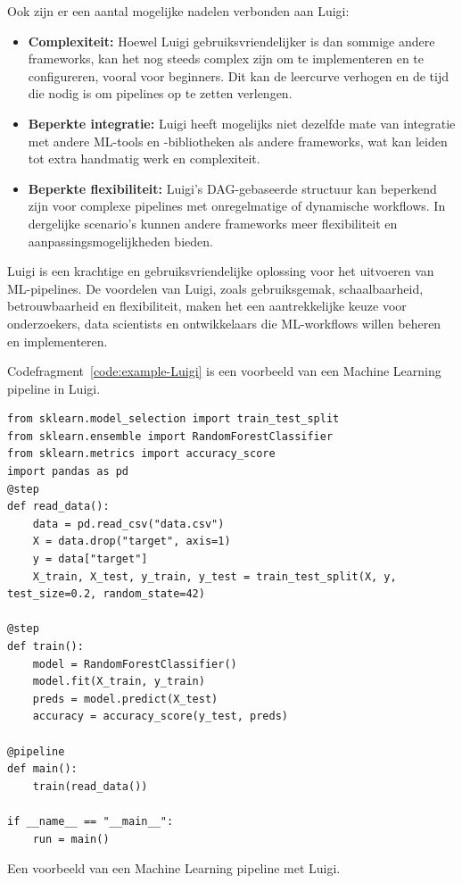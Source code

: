 Ook zijn er een aantal mogelijke nadelen verbonden aan Luigi:
\begin{itemize}
    \item \textbf{Complexiteit:} Hoewel Luigi gebruiksvriendelijker is dan sommige andere frameworks, kan het nog steeds complex zijn om te implementeren en te configureren, vooral voor beginners. Dit kan de leercurve verhogen en de tijd die nodig is om pipelines op te zetten verlengen.
    \item \textbf{Beperkte integratie:} Luigi heeft mogelijks niet dezelfde mate van integratie met andere ML-tools en -bibliotheken als andere frameworks, wat kan leiden tot extra handmatig werk en complexiteit.
    \item \textbf{Beperkte flexibiliteit:} Luigi's DAG-gebaseerde structuur kan beperkend zijn voor complexe pipelines met onregelmatige of dynamische workflows. In dergelijke scenario's kunnen andere frameworks meer flexibiliteit en aanpassingsmogelijkheden bieden.
  \end{itemize}

Luigi is een krachtige en gebruiksvriendelijke oplossing voor het uitvoeren van ML-pipelines. De voordelen van Luigi, zoals gebruiksgemak, schaalbaarheid, betrouwbaarheid en flexibiliteit, maken het een aantrekkelijke keuze voor onderzoekers, data scientists en ontwikkelaars die ML-workflows willen beheren en implementeren.

Codefragment~\ref{code:example-Luigi} is een voorbeeld van een Machine Learning pipeline in Luigi.

\begin{listing}
\begin{verbatim}
from sklearn.model_selection import train_test_split
from sklearn.ensemble import RandomForestClassifier
from sklearn.metrics import accuracy_score
import pandas as pd
@step
def read_data():
    data = pd.read_csv("data.csv")
    X = data.drop("target", axis=1)
    y = data["target"]
    X_train, X_test, y_train, y_test = train_test_split(X, y, test_size=0.2, random_state=42)

@step    
def train():
    model = RandomForestClassifier()
    model.fit(X_train, y_train)
    preds = model.predict(X_test)
    accuracy = accuracy_score(y_test, preds)

@pipeline
def main():
    train(read_data())

if __name__ == "__main__":
    run = main()
\end{verbatim}
\caption[Voorbeeld van een Machine Learning pipeline met Luigi.]{\label{code:example-Luigi}Een voorbeeld van een Machine Learning pipeline met Luigi.}
\end{listing}

